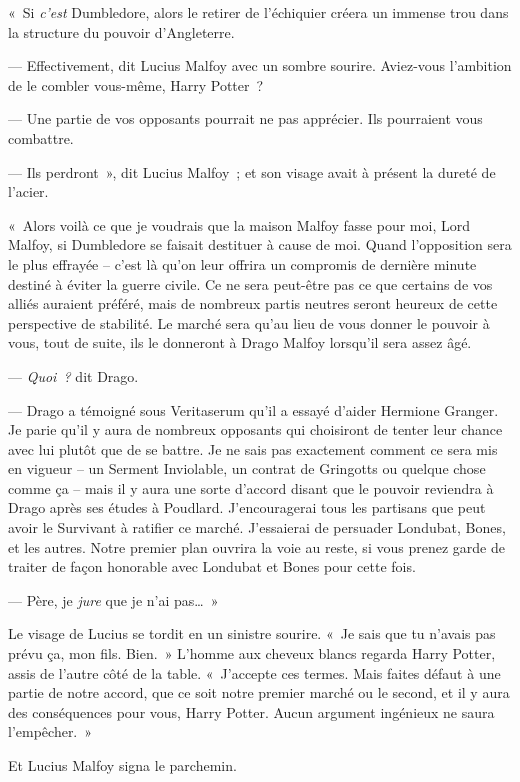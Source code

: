 «~Si \emph{c'est} Dumbledore, alors le retirer de l'échiquier créera un immense trou dans la structure du pouvoir d'Angleterre.

--- Effectivement, dit Lucius Malfoy avec un sombre sourire. Aviez-vous l'ambition de le combler vous-même, Harry Potter~?

--- Une partie de vos opposants pourrait ne pas apprécier. Ils pourraient vous combattre.

--- Ils perdront~», dit Lucius Malfoy~; et son visage avait à présent la dureté de l'acier.

«~Alors voilà ce que je voudrais que la maison Malfoy fasse pour moi, Lord Malfoy, si Dumbledore se faisait destituer à cause de moi. Quand l'opposition sera le plus effrayée -- c'est là qu'on leur offrira un compromis de dernière minute destiné à éviter la guerre civile. Ce ne sera peut-être pas ce que certains de vos alliés auraient préféré, mais de nombreux partis neutres seront heureux de cette perspective de stabilité. Le marché sera qu'au lieu de vous donner le pouvoir à vous, tout de suite, ils le donneront à Drago Malfoy lorsqu'il sera assez âgé.

--- \emph{Quoi~?} dit Drago.

--- Drago a témoigné sous Veritaserum qu'il a essayé d'aider Hermione Granger. Je parie qu'il y aura de nombreux opposants qui choisiront de tenter leur chance avec lui plutôt que de se battre. Je ne sais pas exactement comment ce sera mis en vigueur -- un Serment Inviolable, un contrat de Gringotts ou quelque chose comme ça -- mais il y aura une sorte d'accord disant que le pouvoir reviendra à Drago après ses études à Poudlard. J'encouragerai tous les partisans que peut avoir le Survivant à ratifier ce marché. J'essaierai de persuader Londubat, Bones, et les autres. Notre premier plan ouvrira la voie au reste, si vous prenez garde de traiter de façon honorable avec Londubat et Bones pour cette fois.

--- Père, je \emph{jure} que je n'ai pas…~»

Le visage de Lucius se tordit en un sinistre sourire. «~Je sais que tu n'avais pas prévu ça, mon fils. Bien.~» L'homme aux cheveux blancs regarda Harry Potter, assis de l'autre côté de la table. «~J'accepte ces termes. Mais faites défaut à une partie de notre accord, que ce soit notre premier marché ou le second, et il y aura des conséquences pour vous, Harry Potter. Aucun argument ingénieux ne saura l'empêcher.~»

Et Lucius Malfoy signa le parchemin.


